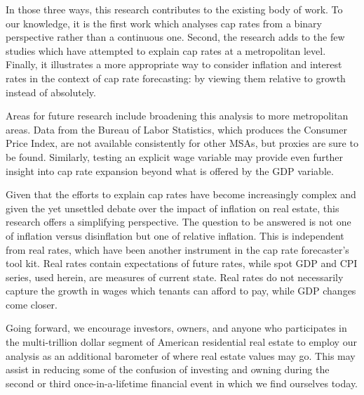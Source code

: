 \documentclass[jrfm,article,accept,oneauthor,pdftex]{Definitions/mdpi}
\begin{document}
In those three ways, this research contributes to the existing body of work. To our knowledge, it is the first work which analyses cap rates from a binary perspective rather than a continuous one. Second, the research adds to the few studies which have attempted to explain cap rates at a metropolitan level.  Finally, it illustrates a more appropriate way to consider inflation and interest rates in the context of cap rate forecasting: by viewing them relative to growth instead of absolutely.

Areas for future research include broadening this analysis to more metropolitan areas. Data from the Bureau of Labor Statistics, which produces the Consumer Price Index, are not available consistently for other MSAs, but proxies are sure to be found. Similarly, testing an explicit wage variable may provide even further insight into cap rate expansion beyond what is offered by the GDP variable. 

Given that the efforts to explain cap rates have become increasingly complex and given the yet unsettled debate over the impact of inflation on real estate, this research offers a simplifying perspective. The question to be answered is not one of inflation versus disinflation but one of relative inflation. This is independent from real rates, which have been another instrument %
in the cap rate forecaster's tool kit. Real rates contain expectations of future rates, while spot GDP and CPI series, used herein, are measures of current state. Real rates do not necessarily capture the growth in wages which tenants can afford to pay, while GDP changes come closer. 

Going forward, we encourage investors, owners, and anyone who participates in the multi-trillion dollar segment of American residential real estate to employ our analysis as an additional barometer of where real estate values may go. This may assist in reducing some of the confusion of investing and owning during the second or third once-in-a-lifetime financial event in which we find ourselves today.


 \institutionalreview{\hl{ } %
}
\end{document}
